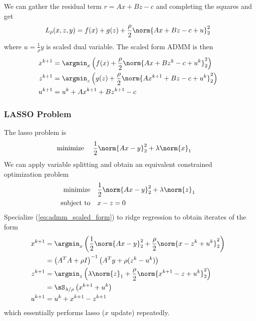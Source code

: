 \documentclass[../writeup.tex]{subfiles}
\begin{document}
We can gather the residual term $r=Ax+Bz-c$ and completing the squares and get
\begin{align}
    L_{\rho}(x,z,y)
        = f(x) + g(z) + \frac{\rho}{2} \norm{Ax + Bz - c + u}_2^2
    \label{eq:admm_scaled_augmented_lagrangian}
\end{align}
where $u=\frac{1}{\rho}y$ is scaled dual variable. The scaled form ADMM is then
\begin{align}
    x^{k+1}
        &= \argmin_x \left(
            f(x) + \frac{\rho}{2} \norm{Ax+Bz^k-c+u^k}_2^2 
        \right)
        \nonumber \\
    z^{k+1}
        &= \argmin_z \left(
            g(z) + \frac{\rho}{2} \norm{Ax^{k+1}+Bz-c+u^k}_2^2
        \right)
        \nonumber \\
    u^{k+1}
        &= u^k + Ax^{k+1} + Bz^{k+1} - c
    \label{eq:admm_scaled_form}
\end{align}

\subsubsection{LASSO Problem}

The lasso problem is 
\begin{align}
    \minimize\;
        & \frac{1}{2} \norm{Ax-y}_2^2 + \lambda \norm{x}_1
    \label{eq:lasso_unconstrained_problem}
\end{align}
We can apply variable splitting and obtain an equivalent constrained optimization problem
\begin{align}
    \minimize
        & \frac{1}{2} \norm{Ax-y}_2^2 + \lambda \norm{z}_1 \\
    \subjectto
        & x - z = 0
    \label{eq:lasso_unconstrained_problem_splitting}
\end{align}
Specialize (\ref{eq:admm_scaled_form}) to ridge regression to obtain iterates of the form
\begin{align} 
    x^{k+1}
        &= \argmin_x \left(
            \frac{1}{2}\norm{Ax-y}_2^2 + \frac{\rho}{2} \norm{x - z^k + u^k}_2^2
        \right) \\
        &= \left( A^TA + \rho I \right)^{-1} \left( A^Ty + \rho(z^{k} - u^k) \right) \\
    z^{k+1}
        &= \argmin_z \left(
            \lambda \norm{z}_1 + \frac{\rho}{2} \norm{x^{k+1} - z + u^k }_2^2
        \right) \\ 
        &= \sS_{\lambda/\rho} \left( x^{k+1} + u^k \right) \\
    u^{k+1}
        &= u^k + x^{k+1} - z^{k+1}
\end{align}
which essentially performs lasso ($x$ update) repeatedly.
\end{document}
